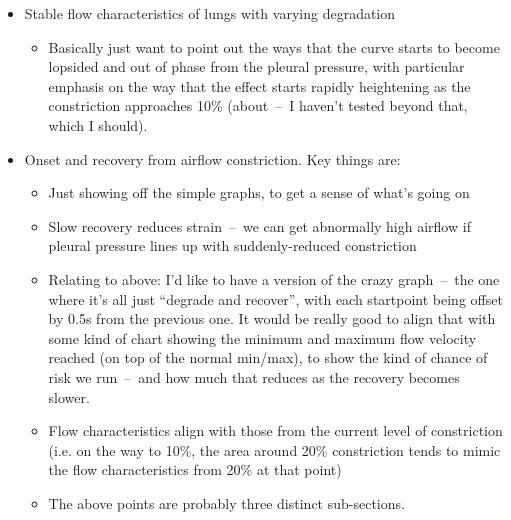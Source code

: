 \begin{itemize}
    \item Stable flow characteristics of lungs with varying degradation
        \begin{itemize}
            \item Basically just want to point out the ways that the curve starts to become
                lopsided and out of phase from the pleural pressure, with particular emphasis on
                the way that the effect starts rapidly heightening as the constriction
                approaches 10\% (about~--~I haven't tested beyond that, which I should).
        \end{itemize}
    \item Onset and recovery from airflow constriction. Key things are:
        \begin{itemize}
            \item Just showing off the simple graphs, to get a sense of what's going on
            \item Slow recovery reduces strain~--~we can get abnormally high airflow if pleural
                pressure lines up with suddenly-reduced constriction 
            \item Relating to above: I'd like to have a version of the crazy graph~--~the one
                where it's all just ``degrade and recover'', with each startpoint being offset
                by 0.5s from the previous one. It would be really good to align that with some
                kind of chart showing the minimum and maximum flow velocity reached (on top of
                the normal min/max), to show the kind of chance of risk we run~--~and how much
                that reduces as the recovery becomes slower.
            \item Flow characteristics align with those from the current level of constriction
                (i.e. on the way to 10\%, the area around 20\% constriction tends to mimic the
                flow characteristics from 20\% at that point)
            \item The above points are probably three distinct sub-sections.
        \end{itemize}
\end{itemize}
